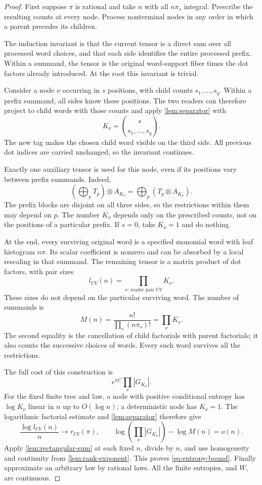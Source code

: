 \begin{proof}
First suppose \(\pi\) is rational and take \(n\) with all \(n\pi_s\)
integral.  Prescribe the resulting counts at every node.
Process nonterminal nodes in any order in which a parent precedes
its children.

The induction invariant is that the current tensor is a direct sum
over all processed word choices, and that each side identifies the
entire processed prefix.  Within a summand, the tensor is the original
word-support fiber times the dot factors already introduced.
At the root this invariant is trivial.

Consider a node \(\nu\) occurring in \(s\) positions, with child counts
\(s_1,\ldots,s_q\).
Within a prefix summand, all sides know these positions.
The two readers can therefore project to child words with those counts
and apply \cref{lem:separator} with
\[
 K_\nu=\binom{s}{s_1,\ldots,s_q}.
\]
The new tag makes the chosen child word visible on the third side.
All previous dot indices are carried unchanged, so the invariant
continues.

Exactly one auxiliary tensor is used for this node, even if its
positions vary between prefix summands.
Indeed,
\[
 \left(\bigoplus_p T_p\right)\otimes A_{K_\nu}
   =\bigoplus_p(T_p\otimes A_{K_\nu}).
\]
The prefix blocks are disjoint on all three sides, so the restrictions
within them may depend on \(p\).
The number \(K_\nu\) depends only on the prescribed counts, not on
the positions of a particular prefix.
If \(s=0\), take \(K_\nu=1\) and do nothing.

At the end, every surviving original word is a specified monomial
word with leaf histogram \(n\pi\).
Its scalar coefficient is nonzero and can be absorbed by a local
rescaling in that summand.
The remaining tensor is a matrix product of dot factors, with pair sizes
\[
 l_{UV}(n)=\prod_{\nu:\,\text{reader pair }UV}K_\nu.
\]
These sizes do not depend on the particular surviving word.
The number of summands is
\begin{equation}\label{eq:multinomial-telescope}
 M(n)=\frac{n!}{\prod_s(n\pi_s)!}=\prod_\nu K_\nu.
\end{equation}
The second equality is the cancellation of child factorials with
parent factorials; it also counts the successive choices of words.
Every such word survives all the restrictions.

The full cost of this construction is
\[
 e^{nC}\prod_\nu |G_{K_\nu}|.
\]
For the fixed finite tree and law, a node with positive conditional
entropy has \(\log K_\nu\) linear in \(n\) up to \(O(\log n)\);
a deterministic node has \(K_\nu=1\).
The logarithmic factorial estimate and
\cref{lem:separator} therefore give
\[
 \frac{\log l_{UV}(n)}n\longrightarrow r_{UV}(\pi),\qquad
 \log\!\left(\prod_\nu|G_{K_\nu}|\right)-\log M(n)=o(n).
\]
Apply \cref{lem:rectangular-sum} at each fixed \(n\), divide by \(n\),
and use homogeneity and continuity from \cref{lem:rank-exponent}.
This proves \eqref{eq:entropy-bound}.
Finally approximate an arbitrary law by rational laws.
All the finite entropies, and \(W\), are continuous.
\end{proof}

